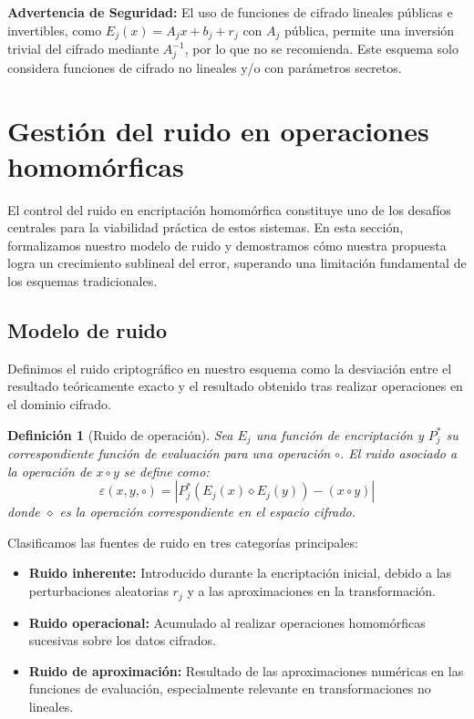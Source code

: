 \documentclass[11pt]{article}
\theoremstyle{plain}
\newtheorem{definition}{Definición}
\begin{document}
\textbf{Advertencia de Seguridad:} El uso de funciones de cifrado lineales públicas e invertibles, como $E_j(x) = A_j x + b_j + r_j$ con $A_j$ pública, permite una inversión trivial del cifrado mediante $A_j^{-1}$, por lo que no se recomienda. Este esquema solo considera funciones de cifrado no lineales y/o con parámetros secretos.

\section{Gestión del ruido en operaciones homomórficas}

El control del ruido en encriptación homomórfica constituye uno de los desafíos centrales para la viabilidad práctica de estos sistemas. En esta sección, formalizamos nuestro modelo de ruido y demostramos cómo nuestra propuesta logra un crecimiento sublineal del error, superando una limitación fundamental de los esquemas tradicionales.

\subsection{Modelo de ruido}

Definimos el ruido criptográfico en nuestro esquema como la desviación entre el resultado teóricamente exacto y el resultado obtenido tras realizar operaciones en el dominio cifrado.

\begin{definition}[Ruido de operación]
Sea $E_j$ una función de encriptación y $P^*_j$ su correspondiente función de evaluación para una operación $\circ$. El ruido asociado a la operación de $x \circ y$ se define como:
\begin{equation}
\varepsilon(x, y, \circ) = |P^*_j(E_j(x) \diamond E_j(y)) - (x \circ y)|
\end{equation}
donde $\diamond$ es la operación correspondiente en el espacio cifrado.
\end{definition}

Clasificamos las fuentes de ruido en tres categorías principales:

\begin{itemize}
    \item \textbf{Ruido inherente:} Introducido durante la encriptación inicial, debido a las perturbaciones aleatorias $r_j$ y a las aproximaciones en la transformación.
    \item \textbf{Ruido operacional:} Acumulado al realizar operaciones homomórficas sucesivas sobre los datos cifrados.
    \item \textbf{Ruido de aproximación:} Resultado de las aproximaciones numéricas en las funciones de evaluación, especialmente relevante en transformaciones no lineales.
\end{itemize}
\end{document}
